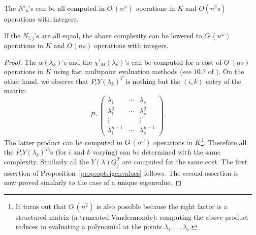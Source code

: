 \documentclass{sig-alternate-05-2015}
\newcommand{\softO}{O\tilde{~}}
\begin{document}
\begin{prop}
\label{prop:opteigenvalues}
The $N'_k$'s can be all computed in $\softO(n^\omega)$ operations
in $K$ and $O(n^2 s)$ operations with integers.

If the $N_{i,j}$'s are all equal, the above complexity can be 
lowered to $\softO(n^\omega)$ operations in $K$ and $O(n s)$ operations 
with integers.
\end{prop}

\begin{proof}
The $\alpha(\lambda_k)$'s and the $\chi'_M(\lambda_k)$'s can be computed 
for a cost of $\softO(ns)$ operations in $K$ using fast multipoint 
evaluation methods (see 10.7 of \cite{gathen-gerhard:13a}).
On the other hand, we observe that $P_i Y(\lambda_k)^T$ is nothing but
the $(i,k)$ entry of the matrix:
$$P \cdot \left( \begin{matrix}
\lambda_1 & \cdots & \lambda_s \\
\lambda_1^2 & \cdots & \lambda_s^2 \\
\vdots & & \vdots \\
\lambda_1^{n-1} & \cdots & \lambda_s^{n-1}
\end{matrix} \right).$$
The latter product can be computed in $\softO(n^\omega)$ operations in 
$K$\footnote{It turns out that $\softO(n^2)$ is also possible because
the right factor is a structured matrix (a truncated Vandermonde):
computing the above product reduces to evaluating a polynomial at the
points $\lambda_1, \ldots, \lambda_s$.}. Therefore all the $P_i 
Y(\lambda_k)^T$'s (for $i$ and $k$ varying) 
can be determined with the same complexity. 
Similarly all the $Y(\lambda) Q_j^T$ are computed for the same cost.
The first assertion of Proposition~\ref{prop:opteigenvalues} follows.
The second assertion is now proved similarly to the case of a unique
eigenvalue.
\end{proof}




\end{document}

